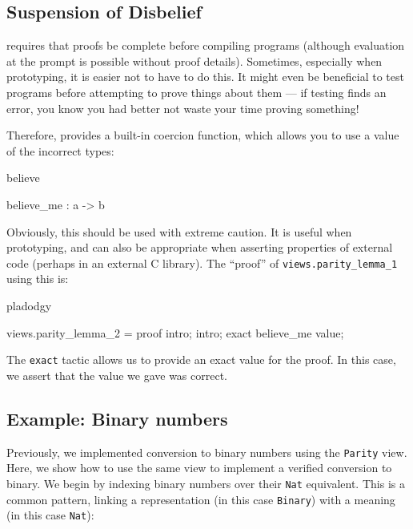 \subsection{Suspension of Disbelief}

\Idris{} requires that proofs be complete before compiling programs (although
evaluation at the prompt is possible without proof details). Sometimes,
especially when prototyping, it is easier not to have to do this. It might even
be beneficial to test programs before attempting to prove things about them ---
if testing finds an error, you know you had better not waste your time proving
something!

Therefore, \Idris{} provides a built-in coercion function, which allows you to use
a value of the incorrect types:

\begin{SaveVerbatim}{believe}

believe_me : a -> b 

\end{SaveVerbatim}

\noindent
Obviously, this should be used with extreme caution. It is useful when prototyping, and
can also be appropriate when asserting properties of external code (perhaps in an
external C library). The ``proof'' of \texttt{views.parity\_lemma\_1} using this is:

\begin{SaveVerbatim}{pladodgy}

views.parity_lemma_2 = proof {
    intro;
    intro;
    exact believe_me value;
}

\end{SaveVerbatim}

\noindent
The \texttt{exact} tactic allows us to provide an exact value for the proof. In this case,
we assert that the value we gave was correct.

\subsection{Example: Binary numbers}

Previously, we implemented conversion to binary numbers using the \texttt{Parity} view.
Here, we show how to use the same view to implement a verified conversion to
binary.
We begin by indexing binary numbers over their \texttt{Nat} equivalent. This is a common
pattern, linking a representation (in this case \texttt{Binary}) with a meaning (in this
case \texttt{Nat}):

